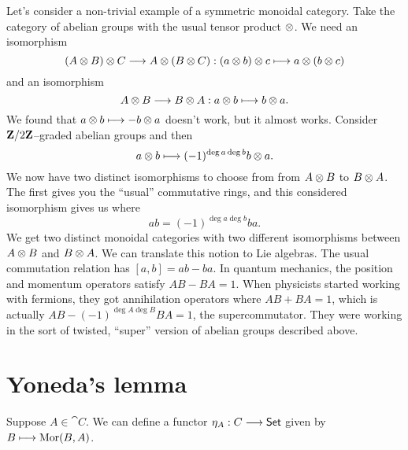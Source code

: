 \documentclass[11pt, oneside]{article}
\begin{document}
Let's consider a non-trivial example of a symmetric monoidal category. Take the category of abelian groups with the usual tensor product $\otimes$. We need an isomorphism 
$$
(A\otimes B)\otimes C \longrightarrow A \otimes (B\otimes C) : (a\otimes b)\otimes c \longmapsto a \otimes (b\otimes c) 
$$
and an isomorphism
$$
A \otimes B \longrightarrow B\otimes A : a\otimes b\longmapsto b\otimes a.
$$ 
We found that $a\otimes b\longmapsto -b\otimes a$ doesn't work, but it almost works. Consider $\mathbf Z/2\mathbf Z$--graded abelian groups and then
$$
a\otimes b \longmapsto (-1)^{\deg a  \deg b}b\otimes a.
$$
We now have two distinct isomorphisms to choose from from $A\otimes B$ to $B\otimes A$. The first gives you the ``usual'' commutative rings, and this considered isomorphism gives us \href{https://en.wikipedia.org/wiki/Supercommutative_algebra}{} where 
$$
ab = (-1)^ {\deg a  \deg b}b a.
$$
We get two distinct monoidal categories with two different isomorphisms between $A\otimes B$ and $B\otimes A$. We can translate this notion to Lie algebras. The usual commutation relation has $[a,b] = ab-ba$. In quantum mechanics, the position and momentum operators satisfy $AB-BA=1$. When physicists started working with fermions, they got annihilation operators where $AB+BA =1$, which is actually $AB - (-1)^{\deg A \deg B} BA = 1$, the supercommutator. They were working in the sort of twisted, ``super'' version of abelian groups described above.

\section{Yoneda's lemma}
Suppose $A \in \cat C$. We can define a functor $\eta_A:\relax C \longrightarrow \textsf{Set}$ given by $B \longmapsto \operatorname{Mor}(B,A)$.
\newpage


\printindex
\end{document}
